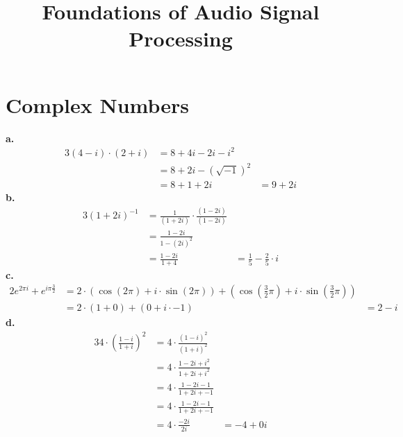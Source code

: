 \documentclass[12pt]{article}
\title{Foundations of Audio Signal Processing\\ \ass}
\author{\auth}
\begin{document}
	\maketitle
	\section{Complex Numbers}
	\textbf{a.}
	\begin{alignat*}{3}
		(4 − i) \cdot (2 + i) &= 8 + 4i - 2i - i^2\\
		&= 8 + 2i - (\sqrt{-1})^2\\
		&= 8 + 1 + 2i &= 9 + 2i
	\end{alignat*}
	\textbf{b.}
	\begin{alignat*}{3}
	(1 + 2i)^{-1} &= \frac{1}{(1 + 2i)} \cdot \frac{(1 - 2i)}{(1 - 2i)}\\
	&= \frac{1 - 2i}{1 - (2i)^2}\\
	&= \frac{1 - 2i}{1 + 4} &= \frac{1}{5} - \frac{2}{5} \cdot i
	\end{alignat*}
	\textbf{c.}
	\begin{alignat*}
	2 e^{2 \pi i} + e^{i \pi \frac{3}{2}} &= 2 \cdot (\cos(2 \pi) + i \cdot \sin(2\pi)) + (\cos(\frac{3}{2}\pi) + i \cdot \sin(\frac{3}{2}\pi))\\
	&= 2 \cdot (1 + 0) + (0 + i \cdot -1) &= 2 - i
	\end{alignat*}
	\textbf{d.}
	\begin{alignat*}{3}
	4 \cdot \left(\frac{1 - i}{1 + i}\right)^2 &= 4 \cdot \frac{(1 - i)^2}{(1 + i)^2}\\
	&= 4 \cdot \frac{1 -2i + i^2}{1 + 2i + i^2}\\
	&= 4 \cdot \frac{1 -2i - 1}{1 + 2i + -1}\\
	&= 4 \cdot \frac{1 -2i - 1}{1 + 2i + -1}\\
	&= 4 \cdot \frac{-2i}{2i} &= - 4 + 0 i
	\end{alignat*}
\end{document}
